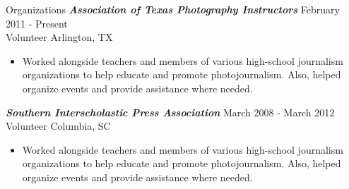 \begin{section}{Organizations}
  {\sl \textbf{Association of Texas Photography Instructors}} \hfill February 2011 - Present \\
  Volunteer \hfill Arlington, TX
  \begin{itemize}
  \item
    Worked alongside teachers and members of various high-school journalism organizations to help educate and promote photojournalism. Also, helped organize events and provide assistance where needed.
  \end{itemize}

  {\sl \textbf{Southern Interscholastic Press Association}} \hfill  March 2008 - March 2012 \\
  Volunteer \hfill Columbia, SC
  \begin{itemize}
  \item
    Worked alongside teachers and members of various high-school journalism organizations to help educate and promote photojournalism. Also, helped organize events and provide assistance where needed.
  \end{itemize}
\end{section}
